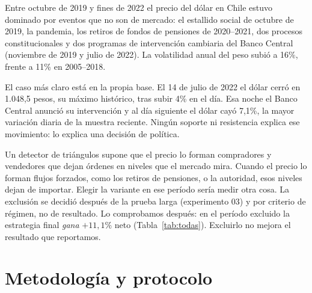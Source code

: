 \documentclass[10pt,a4paper]{article}
\begin{document}
Entre octubre de 2019 y fines de 2022 el precio del dólar en Chile estuvo dominado
por eventos que no son de mercado: el estallido social de octubre de 2019, la
pandemia, los retiros de fondos de pensiones de 2020--2021, dos procesos
constitucionales y dos programas de intervención cambiaria del Banco Central
(noviembre de 2019 y julio de 2022). La volatilidad anual del peso subió a 16\%,
frente a 11\% en 2005--2018.

El caso más claro está en la propia base. El 14 de julio de 2022 el dólar cerró
en 1.048,5 pesos, su máximo histórico, tras subir 4\% en el día. Esa noche el Banco
Central anunció su intervención y al día siguiente el dólar cayó 7,1\%, la mayor
variación diaria de la muestra reciente. Ningún soporte ni resistencia explica ese
movimiento: lo explica una decisión de política.

Un detector de triángulos supone que el precio lo forman compradores y vendedores
que dejan órdenes en niveles que el mercado mira. Cuando el precio lo forman flujos
forzados, como los retiros de pensiones, o la autoridad, esos niveles dejan de
importar. Elegir la variante en ese período sería medir otra cosa. La exclusión se
decidió después de la prueba larga (experimento 03) y por criterio de régimen, no
de resultado. Lo comprobamos después: en el período excluido la estrategia final
\emph{gana} $+11{,}1\%$ neto (Tabla~\ref{tab:todas}). Excluirlo no mejora el
resultado que reportamos.

\section{Metodología y protocolo}\label{sec:metodo}
\end{document}
